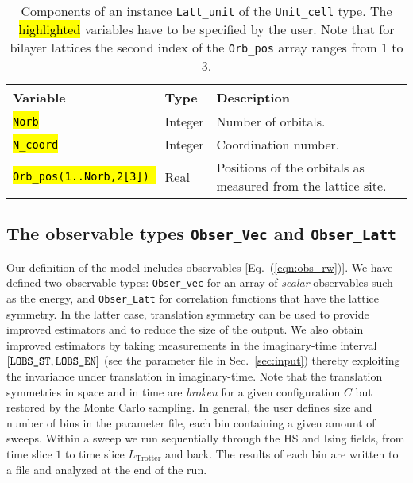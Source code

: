 \begin{table}[h]
	\begin{center}
   \begin{tabular}{@{} l l l @{}}\toprule
    Variable  & Type & Description \\\midrule
     \hl{\texttt{Norb}}   & Integer    & Number of orbitals.  \\
      \hl{\texttt{N\_coord}} & Integer & Coordination number.  \\
       \hl{\texttt{Orb\_pos(1..Norb,2[3]) }} & Real & Positions of the orbitals as measured from the lattice site.  \\\bottomrule
   \end{tabular}
     \caption{Components of an instance \texttt{Latt\_unit} of the \texttt{Unit\_cell} type.
   The \hl{highlighted} variables have to be specified by the user. Note that for bilayer lattices the second index of the \texttt{Orb\_pos} array  ranges from $1$ to $3$.  } 
    \label{table:unit_cell}
\end{center}
\end{table}






\subsection{The observable types \texttt{Obser\_Vec} and \texttt{Obser\_Latt}}\label{sec:obs}

Our definition  of the model includes observables [Eq.~(\ref{eqn:obs_rw})]. We have defined two observable types: \texttt{Obser\_vec}  for an array of \emph{scalar} observables
such as the energy, and  \texttt{Obser\_Latt}   for correlation functions that have the lattice symmetry. In the latter case, translation symmetry can be used to provide improved estimators and to reduce the size of the output.   
We also obtain improved estimators by taking measurements in the imaginary-time interval $[\texttt{LOBS\_ST},\texttt{LOBS\_EN\texttt{}}]$ (see the parameter file in Sec.~\ref{sec:input}) thereby exploiting the invariance under translation in imaginary-time.
Note that the translation symmetries  in space and in time are \emph{broken} for a given  configuration $C$ but restored by the Monte Carlo sampling. 
In general, the user defines size and number of bins in the parameter file, each bin containing a given amount of sweeps. Within a sweep we run sequentially through the HS and Ising fields, from time slice $1$ to time slice $L_{\text{Trotter}}$ and back.  The results of each bin are written to a file  and analyzed at the end of the run.     

